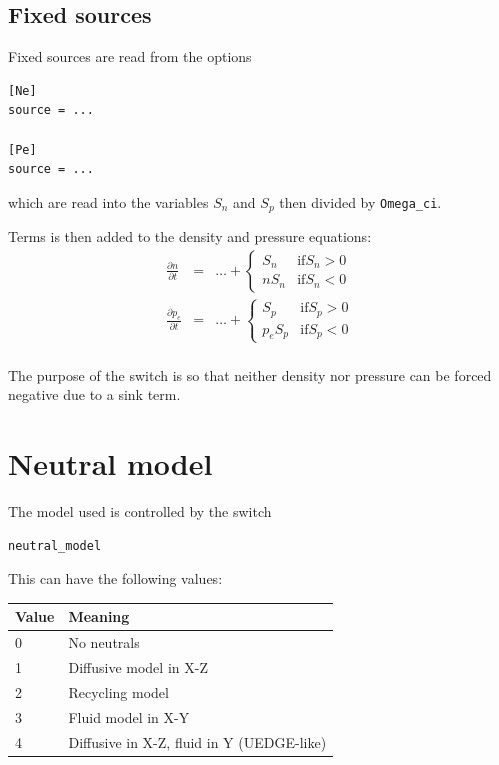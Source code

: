 \documentclass[12pt,a4paper]{article}
\begin{document}
\subsection{Fixed sources}

Fixed sources are read from the options
\begin{verbatim}
[Ne]
source = ...

[Pe]
source = ...
\end{verbatim}
which are read into the variables $S_n$ and $S_p$ then divided by \texttt{Omega\_ci}.

Terms is then added to the density and pressure equations:
\begin{eqnarray}
  \frac{\partial n}{\partial t} &=& \ldots + \left\{\begin{array}{cc}
  S_n & \mathrm{if} S_n > 0 \\
  n S_n & \mathrm{if} S_n < 0
  \end{array}\right. \\
  \frac{\partial p_e}{\partial t} &=& \ldots + \left\{\begin{array}{cc}
  S_p & \mathrm{if} S_p > 0 \\
  p_e S_p & \mathrm{if} S_p < 0
  \end{array}\right. \\
\end{eqnarray}

The purpose of the switch is so that neither density nor pressure can be forced negative due to a sink term.

\section{Neutral model}
\label{sec:neutrals}

The model used is controlled by the switch

\begin{verbatim}
neutral_model
\end{verbatim}

This can have the following values:

\begin{tabular}{ll}
Value & Meaning \\
\hline
\hline
0 & No neutrals \\
1 & Diffusive model in X-Z \\
2 & Recycling model \\
3 & Fluid model in X-Y \\
4 & Diffusive in X-Z, fluid in Y (UEDGE-like) \\
\hline
\hline
\end{tabular}
\end{document}
